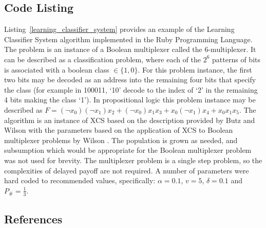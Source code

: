\subsection{Code Listing}
Listing~\ref{learning_classifier_system} provides an example of the Learning Classifier System algorithm implemented in the Ruby Programming Language. 
The problem is an instance of a Boolean multiplexer called the 6-multiplexer. It can be described as a classification problem, where each of the $2^6$ patterns of bits is associated with a boolean class $\in \{1,0\}$. For this problem instance, the first two bits may be decoded as an address into the remaining four bits that specify the class (for example in 100011, `10' decode to the index of `2' in the remaining 4 bits making the class `1'). In propositional logic this problem instance may be described as $F=(\neg x_0) (\neg x_1) x_2 + (\neg x_0) x_1 x_3 + x_0 (\neg x_1) x_4 + x_0 x_1 x_5$. 
The algorithm is an instance of XCS based on the description provided by Butz and Wilson \cite{Butz2002a} with the parameters based on the application of XCS to Boolean multiplexer problems by Wilson \cite{Wilson1995, Wilson1998}.
The population is grown as needed, and subsumption which would be appropriate for the Boolean multiplexer problem was not used for brevity. The multiplexer problem is a single step problem, so the complexities of delayed payoff are not required. A number of parameters were hard coded to recommended values, specifically: $\alpha=0.1$, $v=5$, $\delta=0.1$ and $P_{\#}=\frac{1}{3}$.




\subsection{References}

